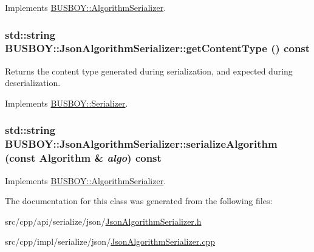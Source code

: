 Implements \hyperlink{classBUSBOY_1_1AlgorithmSerializer_aa55f37cca334564784fa624d4dbacc46}{BUSBOY::AlgorithmSerializer}.\hypertarget{classBUSBOY_1_1JsonAlgorithmSerializer_a4cda821d824b5e42b927e99b54c75ba0}{
\subsubsection[{getContentType}]{\setlength{\rightskip}{0pt plus 5cm}std::string BUSBOY::JsonAlgorithmSerializer::getContentType () const}}
\label{classBUSBOY_1_1JsonAlgorithmSerializer_a4cda821d824b5e42b927e99b54c75ba0}


Returns the content type generated during serialization, and expected during deserialization. 

Implements \hyperlink{classBUSBOY_1_1Serializer_aadfd0df50149a0c59424b5910c5ae3ef}{BUSBOY::Serializer}.\hypertarget{classBUSBOY_1_1JsonAlgorithmSerializer_a2d8cf25399a01735700b37f9e894f4f8}{
\subsubsection[{serializeAlgorithm}]{\setlength{\rightskip}{0pt plus 5cm}std::string BUSBOY::JsonAlgorithmSerializer::serializeAlgorithm (const {\bf Algorithm} \& {\em algo}) const}}
\label{classBUSBOY_1_1JsonAlgorithmSerializer_a2d8cf25399a01735700b37f9e894f4f8}


Implements \hyperlink{classBUSBOY_1_1AlgorithmSerializer_a70b04ce235dc839571885a368bdb2192}{BUSBOY::AlgorithmSerializer}.

The documentation for this class was generated from the following files:\begin{DoxyCompactItemize}
\item 
src/cpp/api/serialize/json/\hyperlink{JsonAlgorithmSerializer_8h}{JsonAlgorithmSerializer.h}\item 
src/cpp/impl/serialize/json/\hyperlink{JsonAlgorithmSerializer_8cpp}{JsonAlgorithmSerializer.cpp}\end{DoxyCompactItemize}
